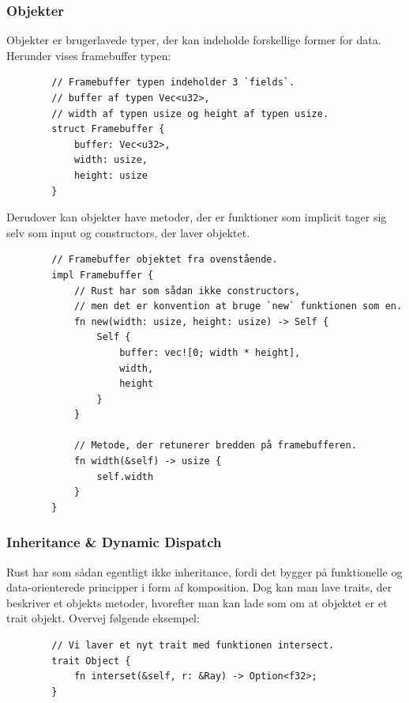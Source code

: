 \documentclass{article}
\begin{document}
\begin{flushleft}
    \subsubsection{Objekter}

    Objekter er brugerlavede typer, der kan indeholde forskellige former for data. Herunder vises framebuffer typen:

    \begin{verbatim}
        // Framebuffer typen indeholder 3 `fields`.
        // buffer af typen Vec<u32>,
        // width af typen usize og height af typen usize.
        struct Framebuffer {
            buffer: Vec<u32>,
            width: usize,
            height: usize
        }
    \end{verbatim}

    Derudover kan objekter have metoder, der er funktioner som implicit tager sig selv som input og constructors, der laver objektet.

    \begin{verbatim}
        // Framebuffer objektet fra ovenstående.
        impl Framebuffer {
            // Rust har som sådan ikke constructors,
            // men det er konvention at bruge `new` funktionen som en.
            fn new(width: usize, height: usize) -> Self {
                Self {
                    buffer: vec![0; width * height],
                    width,
                    height
                }
            }

            // Metode, der retunerer bredden på framebufferen.
            fn width(&self) -> usize {
                self.width
            }
        }
    \end{verbatim}

    \subsubsection{Inheritance \& Dynamic Dispatch}

    Rust har som sådan egentligt ikke inheritance,
    fordi det bygger på funktionelle og data-orienterede principper i form af komposition.
    Dog kan man lave traits, der beskriver et objekts metoder,
    hvorefter man kan lade som om at objektet er et trait objekt.
    Overvej følgende eksempel:

    \begin{verbatim}
        // Vi laver et nyt trait med funktionen intersect.
        trait Object {
            fn interset(&self, r: &Ray) -> Option<f32>;
        }


\end{verbatim}
\end{flushleft}
\end{document}
